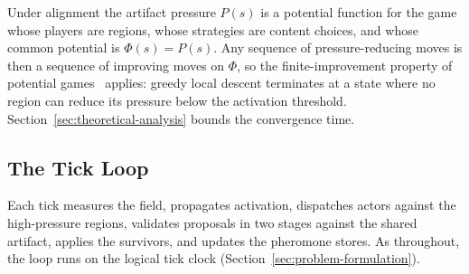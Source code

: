 Under alignment the artifact pressure $P(s)$ is a potential function for the game whose players are regions, whose strategies are content choices, and whose common potential is $\Phi(s) = P(s)$. Any sequence of pressure-reducing moves is then a sequence of improving moves on $\Phi$, so the finite-improvement property of potential games~\cite{monderer1996potential} applies: greedy local descent terminates at a state where no region can reduce its pressure below the activation threshold. Section~\ref{sec:theoretical-analysis} bounds the convergence time.

\subsection{The Tick Loop}
\label{sec:method}

Each tick measures the field, propagates activation, dispatches actors against the high-pressure regions, validates proposals in two stages against the shared artifact, applies the survivors, and updates the pheromone stores. As throughout, the loop runs on the logical tick clock (Section~\ref{sec:problem-formulation}).

